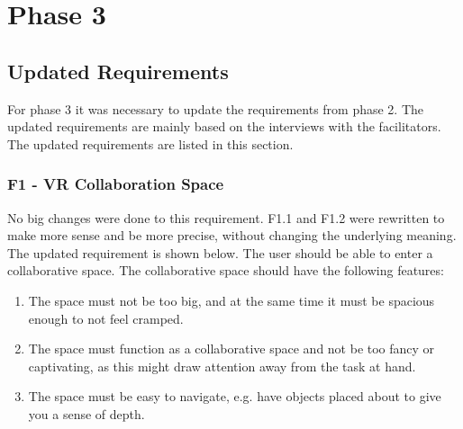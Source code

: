 \chapter{Phase 3}
    \label{chapter:phase3}
    \section{Updated Requirements} %
    For phase 3 it was necessary to update the requirements from phase 2. The updated requirements are mainly based on the interviews with the facilitators. The updated requirements are listed in this section.
    
        \subsection{F1 - VR Collaboration Space} %
        No big changes were done to this requirement. F1.1 and F1.2 were rewritten to make more sense and be more precise, without changing the underlying meaning. The updated requirement is shown below.
        \newline\newline
        The user should be able to enter a collaborative space. The collaborative space should have the following features:
        \begin{enumerate}
            \item The space must not be too big, and at the same time it must be spacious enough to not feel cramped.
            \item The space must function as a collaborative space and not be too fancy or captivating, as this might draw attention away from the task at hand.
            \item The space must be easy to navigate, e.g. have objects placed about to give you a sense of depth.
        \end{enumerate}
        
